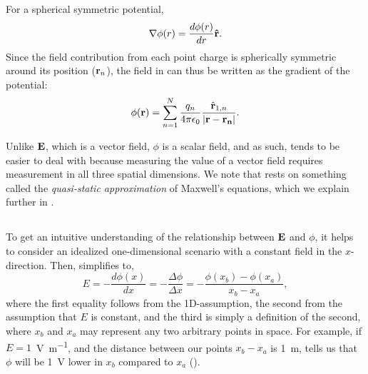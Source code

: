 For a spherical symmetric potential,
\begin{equation}
{\bf \nabla} \phi(r) = \frac{d\phi(r)}{dr} {\bf \hat{r}}.
\label{eq:Basics:SphericalNablaPhi}
\end{equation}
Since the field contribution from each point charge is spherically symmetric around its position (${\bf r}_n$), the field in  can thus be written as the gradient of the potential:
\begin{equation}
{\phi}({\bf r}) = \sum_{n=1}^{N}  \frac{q_n}{4\pi \epsilon_0} \frac{\hat{{\bf r}}_{1,n}}{|{\bf r}-{\bf r_n}|}.
\label{eq:Basics:CoulombPhiN}
\end{equation}

Unlike ${\bf E}$, which is a vector field, $\phi$ is a scalar field, and as such, tends to be easier to deal with because measuring the value of a vector field requires measurement in all three spatial dimensions. We note that  rests on something called the \textit{quasi-static approximation} of Maxwell's equations, which we explain further in .

 


\subsection{}
\label{sec:Basics:Ground}
To get an intuitive understanding of the relationship between ${\bf E}$ and $\phi$, it helps to consider an idealized one-dimensional scenario with a constant field in the $x$-direction. Then,  simplifies to,
\begin{equation}
E = -\frac{d\phi(x)}{dx} = -\frac{\Delta \phi}{\Delta x} = -\frac{\phi(x_b)-\phi(x_a)}{x_b-x_a},
\label{eq:Basics:EV1D}
\end{equation}
where the first equality follows from the 1D-assumption, the second from the assumption that $E$ is constant, and the third is simply a definition of the second, where $x_b$ and $x_a$ may represent any two arbitrary points in space. For example, if $E = 1$~\si{\volt\per\metre}, and the distance between our points $x_b-x_a$ is 1~\si{\metre},  tells us that $\phi$ will be 1~\si{\volt} lower in $x_b$ compared to $x_a$ ().


